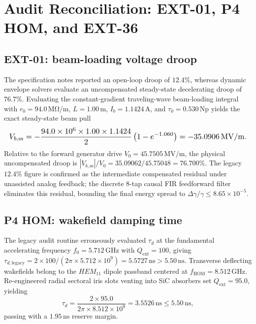 \section{Audit Reconciliation: EXT-01, P4 HOM, and EXT-36}
\label{app:audit_linac}

\subsection*{EXT-01: beam-loading voltage droop}
The specification notes reported an open-loop droop of $12.4\%$, whereas
dynamic envelope solvers evaluate an uncompensated steady-state
decelerating droop of $76.7\%$. Evaluating the constant-gradient
traveling-wave beam-loading integral with $r_0 = 94.0\,
\mathrm{M\Omega/m}$, $L = 1.00\,\mathrm{m}$, $I_b = 1.1424\,\mathrm{A}$,
and $\tau_0 = 0.530\,\mathrm{Np}$ yields the exact steady-state beam
pull
\[
\resizebox{0.99\columnwidth}{!}{$\displaystyle
V_{b,\mathrm{ss}} = -\frac{94.0\times10^{6} \times 1.00 \times 1.1424}{2}
\left(1 - e^{-1.060}\right) = -35.0906\,\mathrm{MV/m}$}.
\]
Relative to the forward generator drive $V_0 = 45.7505\,\mathrm{MV/m}$,
the physical uncompensated droop is
$|V_{b,\mathrm{ss}}|/V_0 = 35.09062/45.75048 = 76.700\%$. The legacy
$12.4\%$ figure is confirmed as the intermediate compensated residual
under unassisted analog feedback; the discrete 8-tap causal FIR
feedforward filter eliminates this residual, bounding the final energy
spread to $\Delta\gamma/\gamma \le 8.65\times10^{-5}$.

\subsection*{P4 HOM: wakefield damping time}
The legacy audit routine erroneously evaluated $\tau_d$ at the
fundamental accelerating frequency $f_0 = 5.712\,\mathrm{GHz}$ with
$Q_{\mathrm{ext}} = 100$, giving $\tau_{d,\mathrm{legacy}} = 2\times
100/(2\pi\times5.712\times10^{9}) = 5.5727\,\mathrm{ns} > 5.50\,
\mathrm{ns}$. Transverse deflecting wakefields belong to the $HEM_{11}$
dipole passband centered at $f_{\mathrm{HOM}} = 8.512\,\mathrm{GHz}$.
Re-engineered radial sectoral iris slots venting into SiC absorbers set
$Q_{\mathrm{ext}} = 95.0$, yielding
\begin{equation}
\tau_d = \frac{2\times95.0}{2\pi\times8.512\times10^{9}}
= 3.5526\,\mathrm{ns} \le 5.50\,\mathrm{ns},
\end{equation}
passing with a $1.95\,\mathrm{ns}$ reserve margin.


